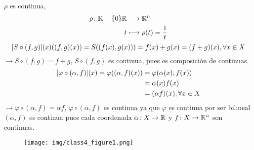 {\begin{description}
		      $\rho $ es continua,
		      \begin{align*}
			      \rho \colon \mathbb{R}-\{0\}  \mathbb{R} & \longrightarrow\mathbb{R}^{n}               \\
			      t                        & \longmapsto \rho(t)= \frac{1}{t}
		      \end{align*}
		      $$
			      \bqty{S\circ (f,g)}(x)\qty((f,g)(x))= S\pqty{(f(x), g(x))} = f(x)+g(x) = (f+g)(x), \forall x \in X
		      $$
		      $\longrightarrow S\circ(f,g) =f+g $, $S\circ(f,g)$ es continua, pues es composición de continuas.
		      \begin{align*}
			      \bqty{\varphi \circ (\alpha, f)}(x) = \varphi((\alpha, f)(x)) & = \varphi(\alpha(x), f(x))      \\
			                                                                    & =\alpha(x) f(x)                 \\
			                                                                    & =(\alpha f)(x), \forall x \in X
		      \end{align*}
		      $\rightarrow \varphi \circ(\alpha, f) = \alpha f $, $ \varphi \circ(\alpha, f)$ es continua ya que $\varphi$ es continua por ser bilineal $(\alpha, f)$ es continua pues cada coordenada $\alpha \colon X\to \mathbb{R}$ y $f \colon X \to \mathbb{R}^{n}$ son continuas.

	\end{description}
}

\vspace{-2em}
\begin{figure}[H]
	\centering
	\texttt{[image: img/class4\_figure1.png]}
\end{figure}
\vspace{-1em}


